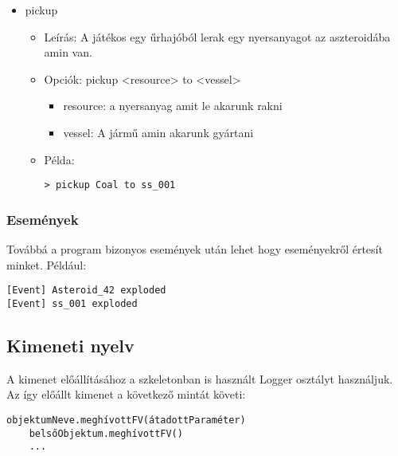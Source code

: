 \documentclass[../../projlab]{subfiles}
\begin{document}
\begin{itemize}
    \item pickup
    \begin{itemize}
        \item Leírás: A játékos egy űrhajóból lerak egy nyersanyagot az aszteroidába amin van.
        \item Opciók: pickup <resource> to <vessel>
        \begin{itemize}
            \item resource: a nyersanyag amit le akarunk rakni
            \item vessel: A jármű amin akarunk gyártani
        \end{itemize}
        \item Példa:
            \begin{verbatim}
> pickup Coal to ss_001
            \end{verbatim}
    \end{itemize}
\end{itemize}

\subsubsection{Események}
Továbbá a program bizonyos események után lehet hogy eseményekről értesít minket.
Például:
\begin{verbatim}
[Event] Asteroid_42 exploded
[Event] ss_001 exploded
\end{verbatim}


\subsection{Kimeneti nyelv}

A kimenet előállításához a szkeletonban is használt Logger osztályt használjuk.
Az így előállt kimenet a következő mintát követi:
\begin{verbatim}
objektumNeve.meghívottFV(átadottParaméter)
	belsőObjektum.meghívottFV()
	...
\end{verbatim}
\end{document}
